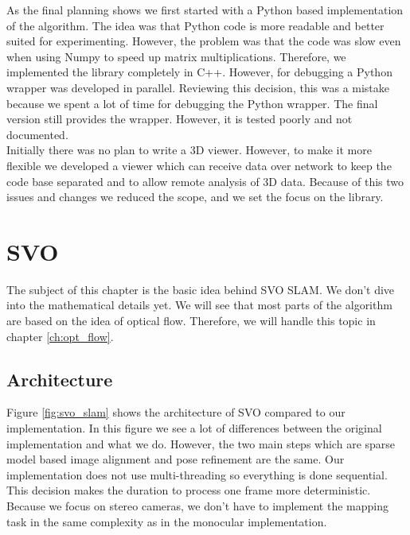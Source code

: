 \documentclass[11pt,a4paper,titlepage,oneside]{report}
\begin{document}
As the final planning shows we first started with a Python based implementation of the algorithm. The idea was that Python code is more readable and better suited for experimenting. However, the problem was that the code was slow even when using Numpy to speed up matrix multiplications. Therefore, we implemented the library completely in C++. However, for debugging a Python wrapper was developed in parallel. Reviewing this decision, this was a mistake because we spent a lot of time for debugging the Python wrapper. The final version still provides the wrapper. However, it is tested poorly and not documented.\\
Initially there was no plan to write a 3D viewer. However, to make it more flexible we developed a viewer which can receive data over network to keep the code base separated and to allow remote analysis of 3D data. Because of this two issues and changes we reduced the scope, and we set the focus on the library.

\chapter{SVO}\label{ch:svo}
The subject of this chapter is the basic idea behind SVO SLAM. We don't dive into the mathematical details yet. We will see that most parts of the algorithm are based on the idea of optical flow. Therefore, we will handle this topic in chapter \ref{ch:opt_flow}.

\section{Architecture}

Figure \ref{fig:svo_slam} shows the architecture of SVO compared to our implementation. In this figure we see a lot of differences between the original implementation and what we do. However, the two main steps which are sparse model based image alignment and pose refinement are the same. Our implementation does not use multi-threading so everything is done sequential. This decision makes the duration to process one frame more deterministic. Because we focus on stereo cameras, we don't have to implement the mapping task in the same complexity as in the monocular implementation.
\end{document}

